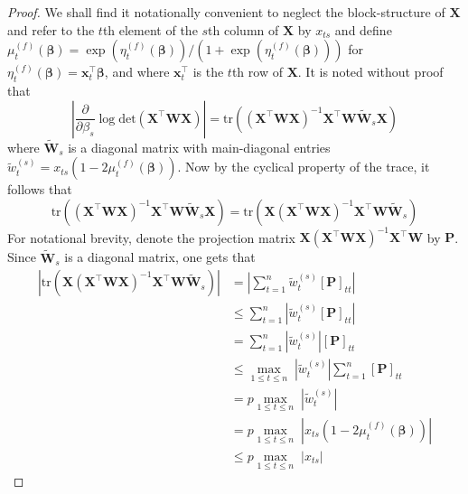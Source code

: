 \documentclass[11pt, a4paper]{article}
\newcommand*{\bb}{\boldsymbol}
\theoremstyle{example} \newtheorem{example}{Example}[section]
\theoremstyle{theorem} \newtheorem{theorem}{Theorem}[section]
\def\bbeta{\bb{\beta}}
\def\bx{\bb{x}}
\def\bX{\bb{X}}
\begin{document}
\begin{proof}
	We shall find it notationally convenient to neglect the block-structure of $\bX$ and refer to the $t$th element of the $s$th column of $\bX$ by $x_{ts}$ and define $\mu_t^{(f)}(\bbeta) = \exp(\eta_t^{(f)}(\bbeta))/(1+\exp(\eta_t^{(f)}(\bbeta)))$ for $\eta_t^{(f)}(\bbeta) = \bx_t^\top\bbeta$, and where $\bx_t^\top$ is the $t$th row of $\bX$. It is noted without proof that 
\[
	\left|\frac{\partial }{\partial \beta_s}\log \textrm{det}(\bb X^\top\bb W\bb X)\right|  = \text{tr}\left( (\bb X^\top\bb W\bb X)^{-1}\bb X^\top\bb W\widetilde{\bb W}_s\bb X \right)
\]
	where $\widetilde{\bb W}_s$ is a diagonal matrix with main-diagonal entries $\widetilde{w}^{(s)}_{t}= x_{ts}(1-2\mu_t^{(f)}(\bb\beta))$. 
	Now by the cyclical property of the trace, it follows that 
\[
	\text{tr}\left( (\bb X^\top\bb W\bb X)^{-1}\bb X^\top\bb W\widetilde{\bb W}_s\bb X \right) =\text{tr}\left( \bb X(\bb X^\top\bb W\bb X)^{-1}\bb X^\top\bb W\widetilde{\bb W}_s \right)
\]
	For notational brevity, denote the projection matrix $\bb X(\bb X^\top\bb W\bb X)^{-1}\bb X^\top\bb W$ by $\bb P$. Since $\widetilde{\bb W}_s$ is a diagonal matrix, one gets that 
	\begin{align*} 
	\left| \text{tr}\left( \bb X(\bb X^\top\bb W\bb X)^{-1}\bb X^\top\bb W\widetilde{\bb W}_s \right) \right| &=  \left| \sum_{t=1}^{n}\widetilde{w}_t^{(s)}[\bb P]_{tt} \right| \\ 
	&\leq \sum_{t=1}^{n}\left|\widetilde{w}_t^{(s)}[\bb P]_{tt} \right| \\ 
	&= \sum_{t=1}^{n}\left|\widetilde{w}_t^{(s)}\right|[\bb P]_{tt}  \\ 
	&\leq \underset{1\leq t \leq n}{\max}\; \left|\widetilde{w}_t^{(s)}\right| \sum_{t=1}^{n}[\bb P]_{tt}  \\ 
	&=p \underset{1\leq t \leq n}{\max}\; \left|\widetilde{w}_t^{(s)}\right|\\ 
	&=p \underset{1\leq t \leq n}{\max}\; \left|x_{ts}(1-2\mu_t^{(f)}(\bb\beta))\right| \\ 
	&\leq p\underset{1\leq t \leq n}{\max}\;\left|x_{ts}\right|  
	\end{align*}

\end{proof}
\end{document}
